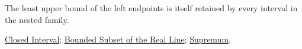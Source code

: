 \begin{remark*}[Interpretation]
The least upper bound of the left endpoints is itself retained by every
interval in the nested family.
\end{remark*}

\begin{dependencies}
\hyperref[def:closed-interval]{Closed Interval};
\hyperref[def:bounded-subset-of-r]{Bounded Subset of the Real Line};
\hyperref[def:supremum]{Supremum}.
\end{dependencies}

